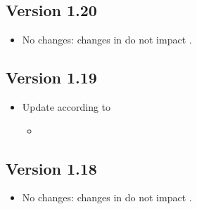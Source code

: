 \subsection*{Version 1.20}
\begin{itemize}
  \item No changes: changes in  do not impact \eacsl.
\end{itemize}

\subsection*{Version 1.19}
\begin{itemize}
  \item Update according to 
    \begin{itemize}
    \item {}
    \end{itemize}
\end{itemize}

\subsection*{Version 1.18}
\begin{itemize}
  \item No changes: changes in  do not impact \eacsl.
\end{itemize}

